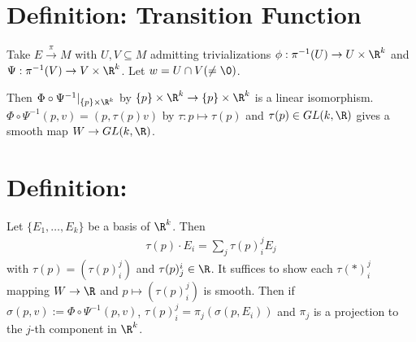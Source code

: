 \documentclass[11pt]{article}
\begin{document}
\section*{Definition: Transition Function}
\label{sec:org6f91b68}
Take \(E\overset{\pi}{\to}M\) with \(U,V\subseteq M\) admitting trivializations \(\phi:\pi^{-1}(U)\to U\times\R^{k}\) and \(\Psi:\pi^{-1}(V)\to V\times\R^{k}\). Let \(w=U\cap V(\neq\0)\).\\


Then \(\Phi\circ\Psi^{-1}|_{\{p\}\times\R^{k}}\) by \(\{p\}\times\R^{k}\to\{p\}\times\R^{k}\) is a linear isomorphism.\\
\(\Phi\circ\Psi^{-1}(p,v)=(p,\tau(p)v)\) by \(\tau:p\mapsto \tau(p)\) and \(\tau(p)\in GL(k,\R)\) gives a smooth map \(W\to GL(k,\R)\).\\
\section*{Definition:}
\label{sec:orga0ea2ca}
Let \(\{E_{1},\ldots, E_{k}\}\) be a basis of \(\R^{k}\). Then\\
\begin{align*}
  \tau(p)\cdot E_{i}=\sum_{j}\tau(p)^{j}_{i}E_{j}
\end{align*}
with \(\tau(p)=(\tau(p)^{j}_{i})\) and \(\tau(p)^{i}_{j}\in\R\). It suffices to show each \(\tau(*)^{j}_{i}\) mapping \(W\to\R\) and \(p\mapsto(\tau(p)^{j}_{i})\) is smooth. Then if \(\sigma(p,v):=\Phi\circ\Psi^{-1}(p,v)\), \(\tau(p)^{j}_{i}=\pi_{j}(\sigma(p,E_{i}))\) and \(\pi_{j}\) is a projection to the \(j\)-th component in \(\R^{k}\).\\
\end{document}
